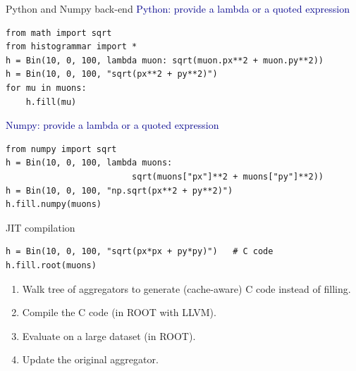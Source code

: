 \documentclass[aspectratio=169]{beamer}
\begin{document}
\begin{frame}[fragile]{Python and Numpy back-end}
\vspace{0.35 cm}
\textcolor{darkblue}{\large Python: provide a lambda or a quoted expression}

\small
\begin{verbatim}
from math import sqrt
from histogrammar import *
h = Bin(10, 0, 100, lambda muon: sqrt(muon.px**2 + muon.py**2))
h = Bin(10, 0, 100, "sqrt(px**2 + py**2)")
for mu in muons:
    h.fill(mu)
\end{verbatim}


\vspace{0.25 cm}
\textcolor{darkblue}{\large Numpy: provide a lambda or a quoted expression}

\small
\begin{verbatim}
from numpy import sqrt
h = Bin(10, 0, 100, lambda muons:
                         sqrt(muons["px"]**2 + muons["py"]**2))
h = Bin(10, 0, 100, "np.sqrt(px**2 + py**2)")
h.fill.numpy(muons)
\end{verbatim}

\vspace{0.25 cm}
\vspace{0.25 cm}
\end{frame}

\begin{frame}[fragile]{JIT compilation}
\begin{verbatim}
h = Bin(10, 0, 100, "sqrt(px*px + py*py)")   # C code
h.fill.root(muons)
\end{verbatim}

\begin{enumerate}\setlength{\itemsep}{0.3 cm}
\item Walk tree of aggregators to generate (cache-aware) C code instead of filling.
\item Compile the C code (in ROOT with LLVM).
\item Evaluate on a large dataset (in ROOT).
\item Update the original aggregator.
\end{enumerate}

\vspace{0.25 cm}
\end{frame}
\end{document}
